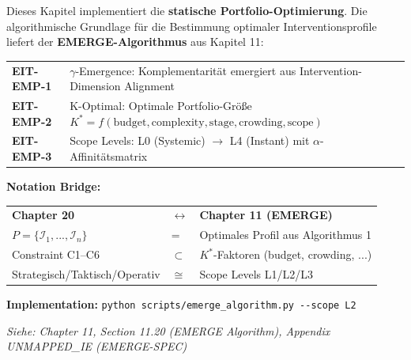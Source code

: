 \begin{tcolorbox}[colback=blue!5!white, colframe=blue!75!black,
    title=\textbf{Cross-Reference: EMERGE Algorithm (Chapter 11, EIT-EMP)}]

Dieses Kapitel implementiert die \textbf{statische Portfolio-Optimierung}. Die algorithmische Grundlage für die Bestimmung optimaler Interventionsprofile liefert der \textbf{EMERGE-Algorithmus} aus Kapitel 11:

\vspace{0.2cm}
\begin{tabular}{@{}p{3.5cm}p{9.5cm}@{}}
\textbf{EIT-EMP-1} & $\gamma$-Emergence: Komplementarität emergiert aus Intervention-Dimension Alignment \\
\textbf{EIT-EMP-2} & K-Optimal: Optimale Portfolio-Größe $K^* = f(\text{budget}, \text{complexity}, \text{stage}, \text{crowding}, \text{scope})$ \\
\textbf{EIT-EMP-3} & Scope Levels: L0 (Systemic) $\to$ L4 (Instant) mit $\alpha$-Affinitätsmatrix \\
\end{tabular}

\vspace{0.2cm}
\textbf{Notation Bridge:}
\begin{tabular}{@{}lll@{}}
\textbf{Chapter 20} & $\leftrightarrow$ & \textbf{Chapter 11 (EMERGE)} \\
$P = \{\mathcal{I}_1, ..., \mathcal{I}_n\}$ & = & Optimales Profil aus Algorithmus 1 \\
Constraint C1--C6 & $\subset$ & $K^*$-Faktoren (budget, crowding, ...) \\
Strategisch/Taktisch/Operativ & $\cong$ & Scope Levels L1/L2/L3 \\
\end{tabular}

\vspace{0.2cm}
\textbf{Implementation:} \texttt{python scripts/emerge\_algorithm.py -{}-scope L2}

\vspace{0.2cm}
\textit{Siehe: Chapter 11, Section 11.20 (EMERGE Algorithm), Appendix UNMAPPED_IE (EMERGE-SPEC)}
\end{tcolorbox}


